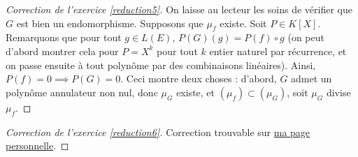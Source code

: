 \begin{proof}[Correction de l'exercice \ref{reduction5}]
	On laisse au lecteur les soins de vérifier que $G$ est bien un endomorphisme. 
    Supposons que $\mu_f$ existe. 
    Soit $P\in K[X]$. 
    Remarquons que pour tout $g\in L(E)$, $P(G)(g)=P(f)\circ g$ (on peut d'abord montrer cela pour $P=X^k$ pour tout $k$ entier naturel par récurrence, 
    et on passe ensuite à tout polynôme par des combinaisons linéaires). Ainsi, $P(f)=0\implies P(G)=0$. 
    Ceci montre deux choses : d'abord, $G$ admet un polynôme annulateur non nul, donc $\mu_G$ existe, et $(\mu_f)\subset (\mu_G)$, soit $\mu_G$ divise $\mu_f$. 
\end{proof}

\begin{proof}[Correction de l'exercice \ref{reduction6}]
    Correction trouvable sur \href{https://perso.eleves.ens-rennes.fr/people/amar.ahmane}{ma page personnelle}.
\end{proof}

